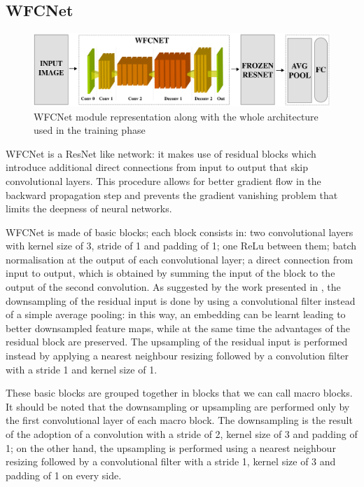 \documentclass[10pt,twocolumn,letterpaper]{article}
\begin{document}
\subsection{WFCNet}

\begin{figure}[t]
	\begin{center}
		\includegraphics[width=\textwidth]{schemi/WFCNet.img.pdf}		
	\end{center}
	\caption{WFCNet module representation along with the whole architecture used in the training phase}
	\label{fig:WFCNet}
\end{figure}

WFCNet is a ResNet like network: it makes use of residual blocks which introduce additional direct connections from input to output that skip convolutional layers. This procedure allows for better gradient flow in the backward propagation step and prevents the gradient vanishing problem that limits the deepness of neural networks.

WFCNet is made of basic blocks; each block consists in: two convolutional layers with kernel size of 3, stride of 1 and padding of 1; one ReLu between them; batch normalisation at the output of each convolutional layer; a direct connection from input to output, which is obtained by summing the input of the block to the output of the second convolution.
As suggested by the work presented in \cite{springenberg2014striving}, the downsampling of the residual input is done by using a convolutional filter instead of a simple average pooling: in this way, an embedding can be learnt leading to better downsampled feature maps, while at the same time the advantages of the residual block are preserved.
The upsampling of the residual input is performed instead by applying a nearest neighbour resizing followed by a convolution filter with a stride 1 and kernel size of 1.

These basic blocks are grouped together in blocks that we can call macro blocks. It should be noted that the downsampling or upsampling are performed only by the first convolutional layer of each macro block. The downsampling is the result of the adoption of a convolution with a stride of 2, kernel size of 3 and padding of 1; on the other hand, the upsampling is performed using a nearest neighbour resizing followed by a convolutional filter with a stride 1, kernel size of 3 and padding of 1 on every side. 
\end{document}
